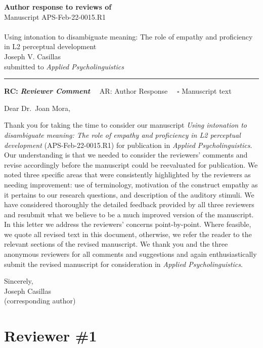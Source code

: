 \documentclass[]{article}
\begin{document}
{\Large\bf Author response to reviews of}\\[1em]
Manuscript APS-Feb-22-0015.R1\\ \\
{\Large Using intonation to disambiguate meaning: The role of empathy and proficiency in L2 perceptual development}\\[1em]
{Joseph V. Casillas}\\
{submitted to \it Applied Psycholinguistics }\\
\hrule

\hfill {\bfseries RC:} \textbf{\textit{Reviewer Comment}}\(\quad\) AR: Author Response \(\quad\square\) Manuscript text

\vspace{2em}

Dear Dr.~Joan Mora,

Thank you for taking the time to consider our manuscript \emph{Using intonation to disambiguate meaning: The role of empathy and proficiency in L2 perceptual development
} (APS-Feb-22-0015.R1) for publication in \emph{Applied Psycholinguistics}.
Our understanding is that we needed to consider the reviewers' comments and revise accordingly before the manuscript could be reevaluated for publication.
We noted three specific areas that were consistently highlighted by the reviewers as needing improvement: use of terminology, motivation of the construct empathy as it pertains to our research questions, and description of the auditory stimuli.
We have considered thoroughly the detailed feedback provided by all three reviewers and resubmit what we believe to be a much improved version of the manuscript.
In this letter we address the reviewers' concerns point-by-point.
Where feasible, we quote all revised text in this document, otherwise, we refer the reader to the relevant sections of the revised manuscript.
We thank you and the three anonymous reviewers for all comments and suggestions and again enthusiastically submit the revised manuscript for consideration in \emph{Applied Psycholinguistics}.

Sincerely,\\
Joseph Casillas\\
(corresponding author)

\clearpage

\hypertarget{reviewer-1}{%
\section{Reviewer \#1}\label{reviewer-1}}
\end{document}
